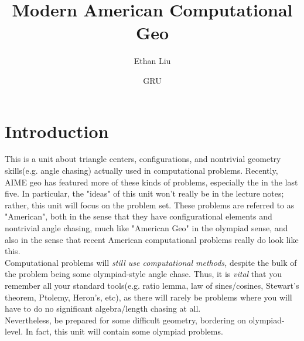\documentclass{article}
\begin{document}
\title{Modern American Computational Geo}
\author{Ethan Liu}
\date{GRU}
\maketitle
\section{Introduction}
This is a unit about triangle centers, configurations, and nontrivial geometry skills(e.g. angle chasing) actually used in computational problems. Recently, AIME geo has featured more of these kinds of problems, especially the in the last five. In particular, the "ideas" of this unit won't really be in the lecture notes; rather, this unit will focus on the problem set. These problems are referred to as "American", both in the sense that they have configurational elements and nontrivial angle chasing, much like "American Geo" in the olympiad sense, and also in the sense that recent American computational problems really do look like this.\\
Computational problems will \textit{still use computational methods,} despite the bulk of the problem being some olympiad-style angle chase. Thus, it is \textit{vital} that you remember all your standard tools(e.g. ratio lemma, law of sines/cosines, Stewart's theorem, Ptolemy, Heron's, etc), as there will rarely be problems where you will have to do no significant algebra/length chasing at all.\\
Nevertheless, be prepared for some difficult geometry, bordering on olympiad-level. In fact, this unit will contain some olympiad problems.
\end{document}
